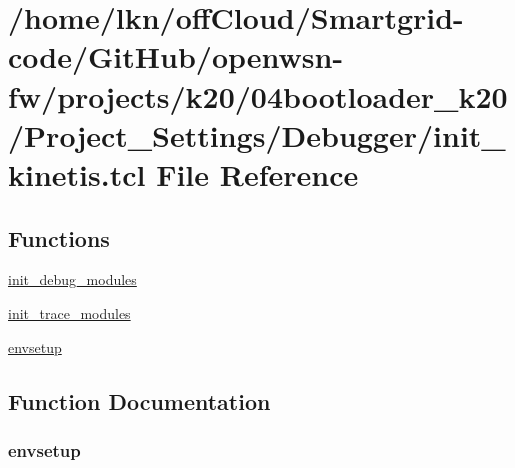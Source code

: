 \hypertarget{04bootloader__k20_2_project___settings_2_debugger_2init__kinetis_8tcl}{}\section{/home/lkn/off\+Cloud/\+Smartgrid-\/code/\+Git\+Hub/openwsn-\/fw/projects/k20/04bootloader\+\_\+k20/\+Project\+\_\+\+Settings/\+Debugger/init\+\_\+kinetis.tcl File Reference}
\label{04bootloader__k20_2_project___settings_2_debugger_2init__kinetis_8tcl}
\subsection*{Functions}
\begin{DoxyCompactItemize}
\item 
\hyperlink{04bootloader__k20_2_project___settings_2_debugger_2init__kinetis_8tcl_a10c80471835dee84e7652764cecbb722}{init\+\_\+debug\+\_\+modules}
\item 
\hyperlink{04bootloader__k20_2_project___settings_2_debugger_2init__kinetis_8tcl_a8ecf61d10da6f21c5b31426f9a235e03}{init\+\_\+trace\+\_\+modules}
\item 
\hyperlink{04bootloader__k20_2_project___settings_2_debugger_2init__kinetis_8tcl_a7f6b4cebda44b6e9d42cc7879ee95e8e}{envsetup}
\end{DoxyCompactItemize}


\subsection{Function Documentation}
\subsubsection[{\texorpdfstring{envsetup}{envsetup}}]{\setlength{\rightskip}{0pt plus 5cm}envsetup}\hypertarget{04bootloader__k20_2_project___settings_2_debugger_2init__kinetis_8tcl_a7f6b4cebda44b6e9d42cc7879ee95e8e}{}\label{04bootloader__k20_2_project___settings_2_debugger_2init__kinetis_8tcl_a7f6b4cebda44b6e9d42cc7879ee95e8e}


